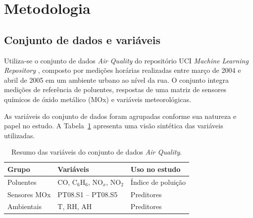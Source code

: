 \section{Metodologia}
\label{sec:metodologia}

\subsection{Conjunto de dados e variáveis}
\label{subsec:dataset}

Utiliza-se o conjunto de dados \textit{Air Quality} do repositório UCI \textit{Machine Learning Repository} \cite{airqualityuci2008}, composto por medições horárias realizadas entre março de 2004 e abril de 2005 em um ambiente urbano ao nível da rua. O conjunto integra medições de referência de poluentes, respostas de uma matriz de sensores químicos de óxido metálico (MOx) e variáveis meteorológicas.

As variáveis do conjunto de dados foram agrupadas conforme sua natureza e papel no estudo. A Tabela~\ref{tab:dataset-simple} apresenta uma visão sintética das variáveis utilizadas.
\begin{table}[htbp]
\centering
\caption{Resumo das variáveis do conjunto de dados \textit{Air Quality}.}
\label{tab:dataset-simple}
\begin{tabular}{l l l}
\toprule
\textbf{Grupo} & \textbf{Variáveis} & \textbf{Uso no estudo} \\
\midrule
Poluentes & CO, C$_6$H$_6$, NO$_x$, NO$_2$ & Índice de poluição \\
Sensores MOx & PT08.S1 -- PT08.S5 & Preditores \\
Ambientais & T, RH, AH & Preditores \\
\bottomrule
\end{tabular}
\end{table}



